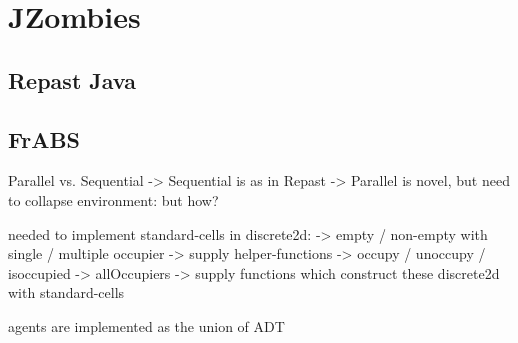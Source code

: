 \section{JZombies}

\subsection{Repast Java}

\subsection{FrABS}
Parallel vs. Sequential
	-> Sequential is as in Repast
	-> Parallel is novel, but need to collapse environment: but how?

needed to implement standard-cells in discrete2d:
	-> empty / non-empty with single / multiple occupier
	-> supply helper-functions
		-> occupy / unoccupy / isoccupied
		-> allOccupiers
	-> supply functions which construct these discrete2d with standard-cells

agents are implemented as the union of ADT